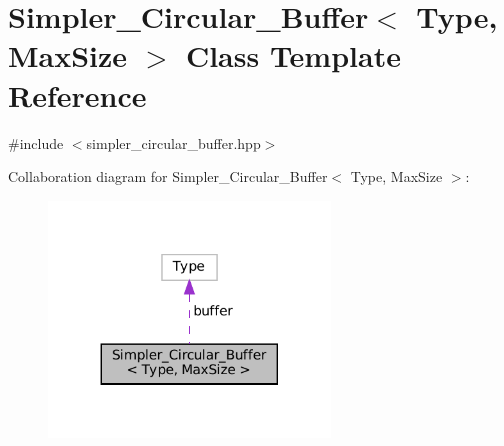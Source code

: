 \hypertarget{classSimpler__Circular__Buffer}{}\section{Simpler\+\_\+\+Circular\+\_\+\+Buffer$<$ Type, Max\+Size $>$ Class Template Reference}
\label{classSimpler__Circular__Buffer}


{\ttfamily \#include $<$simpler\+\_\+circular\+\_\+buffer.\+hpp$>$}



Collaboration diagram for Simpler\+\_\+\+Circular\+\_\+\+Buffer$<$ Type, Max\+Size $>$\+:\nopagebreak
\begin{figure}[H]
\begin{center}
\leavevmode
\includegraphics[width=212pt]{classSimpler__Circular__Buffer__coll__graph}
\end{center}
\end{figure}
